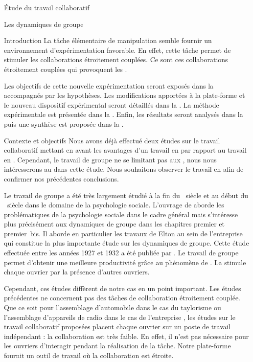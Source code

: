 \documentclass[myfrancais]{mythesis}
\begin{document}
\begin{mypart}{Étude du travail collaboratif}
\begin{mychapter}{Les dynamiques de groupe}
\begin{mysection}{Introduction}
				La tâche élémentaire de manipulation semble fournir un environnement d'expérimentation favorable.
				En effet, cette tâche permet de stimuler les collaborations étroitement couplées.
				Ce sont ces collaborations étroitement couplées qui provoquent les .

				Les objectifs de cette nouvelle expérimentation seront exposés dans la  accompagnés par les hypothèses.
				Les modifications apportées à la plate-forme et le nouveau dispositif expérimental seront détaillés dans la .
				La méthode expérimentale est présentée dans la .
				Enfin, les résultats seront analysés dans la  puis une synthèse est proposée dans la .
			\end{mysection}
			\begin{mysection}{Contexte et objectifs}
				Nous avons déjà effectué deux études sur le travail collaboratif mettant en avant les avantages d'un travail en  par rapport au travail en .
				Cependant, le travail de groupe ne se limitant pas aux , nous nous intéresserons au  dans cette étude.
				Nous souhaitons observer le travail en  afin de confirmer nos précédentes conclusions.

				Le travail de groupe a été très largement étudié à la fin du ~siècle et au début du ~siècle dans le domaine de la psychologie sociale.
				L'ouvrage de  aborde les problématiques de la psychologie sociale dans le cadre général mais s'intéresse plus précisément aux dynamiques de groupe dans les chapitres premier et premier~bis.
				Il aborde en particulier les travaux de Elton  au sein de l'entreprise \myHawthorne qui constitue la plus importante étude sur les dynamiques de groupe.
				Cette étude effectuée entre les années 1927 et 1932 a été publiée par .
				Le travail de groupe permet d'obtenir une meilleure productivité grâce au phénomène de .
				La  stimule chaque ouvrier par la présence d'autres ouvriers.

				Cependant, ces études diffèrent de notre cas en un point important.
				Les études précédentes ne concernent pas des tâches de collaboration étroitement couplée.
				Que ce soit pour l'assemblage d'automobile dans le cas du taylorisme ou l'assemblage d'appareils de radio dans le cas de l'entreprise \myHawthorne, les études sur le travail collaboratif proposées placent chaque ouvrier sur un poste de travail indépendant : la collaboration est très faible.
				En effet, il n'est pas nécessaire pour les ouvriers d'interagir pendant la réalisation de la tâche.
				Notre plate-forme fournit un outil de travail où la collaboration est étroite.


\end{mysection}
\end{mychapter}
\end{mypart}
\end{document}
